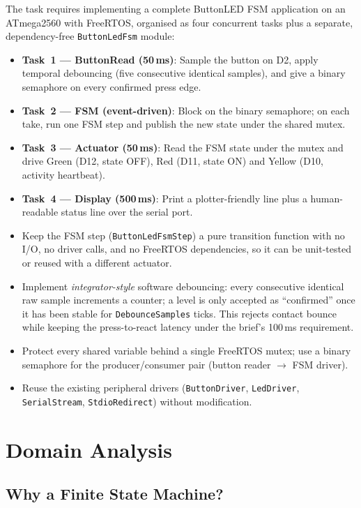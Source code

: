\documentclass[12pt]{article}
\begin{document}
The task requires implementing a complete ButtonLED FSM application on an ATmega2560 with FreeRTOS, organised as four concurrent tasks plus a separate, dependency-free \texttt{ButtonLedFsm} module:
\begin{itemize}
  \item \textbf{Task~1 --- ButtonRead (50\,ms)}: Sample the button on D2, apply temporal debouncing (five consecutive identical samples), and give a binary semaphore on every confirmed press edge.
  \item \textbf{Task~2 --- FSM (event-driven)}: Block on the binary semaphore; on each take, run one FSM step and publish the new state under the shared mutex.
  \item \textbf{Task~3 --- Actuator (50\,ms)}: Read the FSM state under the mutex and drive Green (D12, state OFF), Red (D11, state ON) and Yellow (D10, activity heartbeat).
  \item \textbf{Task~4 --- Display (500\,ms)}: Print a plotter-friendly line plus a human-readable status line over the serial port.
  \item Keep the FSM step (\texttt{ButtonLedFsmStep}) a pure transition function with no I/O, no driver calls, and no FreeRTOS dependencies, so it can be unit-tested or reused with a different actuator.
  \item Implement \emph{integrator-style} software debouncing: every consecutive identical raw sample increments a counter; a level is only accepted as \enquote{confirmed} once it has been stable for \texttt{DebounceSamples} ticks. This rejects contact bounce while keeping the press-to-react latency under the brief's 100\,ms requirement.
  \item Protect every shared variable behind a single FreeRTOS mutex; use a binary semaphore for the producer/consumer pair (button reader $\to$ FSM driver).
  \item Reuse the existing peripheral drivers (\texttt{ButtonDriver}, \texttt{LedDriver}, \texttt{SerialStream}, \texttt{StdioRedirect}) without modification.
\end{itemize}

\section{Domain Analysis}

\subsection{Why a Finite State Machine?}
\end{document}
